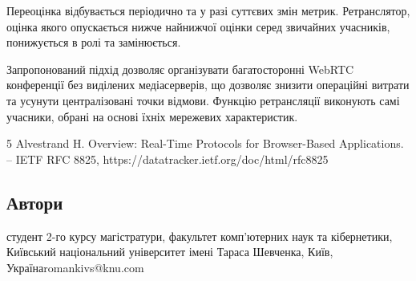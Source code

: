 \documentclass{SHVpaper}
\begin{document}
Переоцінка відбувається періодично та у разі суттєвих змін метрик. Ретранслятор, оцінка якого опускається нижче найнижчої оцінки серед звичайних учасників, понижується в ролі та замінюється.

Запропонований підхід дозволяє організувати багатосторонні WebRTC конференції без виділених медіасерверів, що дозволяє знизити операційні витрати та усунути централізовані точки відмови. Функцію ретрансляції виконують самі учасники, обрані на основі їхніх мережевих характеристик.

\begin{thebibliography}{5}
 Alvestrand H. Overview: Real-Time Protocols for Browser-Based Applications. -- IETF RFC 8825, https://datatracker.ietf.org/doc/html/rfc8825
\end{thebibliography}

\subsection{Автори}
\author{Романків Святослав Степанович}{студент 2-го курсу магістратури, факультет комп'ютерних наук та кібернетики, Київський національний університет імені Тараса Шевченка, Київ, Україна}{romankivs@knu.com}
\end{document}
